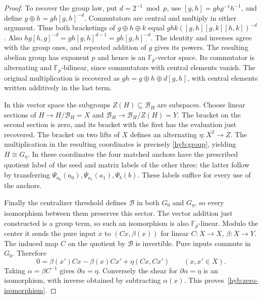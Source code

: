 \documentclass[11pt]{article}
\newcommand{\F}{\mathbb F_p}
\theoremstyle{definition}
\theoremstyle{remark}
\numberwithin{equation}{section}
\begin{document}
\begin{proof}
To recover the group law, put \(d=2^{-1}\bmod p\),
use \([g,h]=ghg^{-1}h^{-1}\), and define
\(g\oplus h=gh[g,h]^{-d}\). Commutators are central and multiply
in either argument. Thus both bracketings of \(g\oplus h\oplus k\)
equal \(ghk([g,h][g,k][h,k])^{-d}\). Also
\(hg[h,g]^{-d}=gh[g,h]^{d-1}=gh[g,h]^{-d}\).
The identity and inverses agree with the group ones, and repeated
addition of \(g\) gives its powers. The resulting abelian group has
exponent \(p\) and hence is an \(\F\)-vector space. Its commutator
is alternating and \(\F\)-bilinear, since commutators with central
elements vanish. The original multiplication is recovered as
\(gh=g\oplus h\oplus d[g,h]\), with central elements written additively
in the last term.

In this vector space the subgroups \(Z(H)\subseteq\mathcal B_H\)
are subspaces. Choose linear sections of \(H\to H/\mathcal B_H=X\)
and \(\mathcal B_H\to\mathcal B_H/Z(H)=Y\).
The bracket on the second section is zero, and its bracket with the
first has the evaluation just recovered. The bracket on two lifts of
\(X\) defines an alternating \(\eta:X^2\to Z\).
The multiplication in the resulting coordinates is precisely
\eqref{hyb:group}, yielding \(H\cong G_\eta\).
In these coordinates the four matched anchors have the prescribed
quotient label of the seed and matrix labels of the other three:
the latter follow by transferring
\(\Psi_{a_0}(a_0),\Psi_{a_1}(a_1),\Psi_b(b)\).
These labels suffice for every use of the anchors.

Finally the centralizer threshold defines \(\mathcal B\) in both
\(G_0\) and \(G_\eta\), so every isomorphism between them preserves
this sector. The vector addition just constructed is a group term,
so such an isomorphism is also \(\F\)-linear. Modulo the center it
sends the pure input \(x\) to \((Cx,\beta(x))\) for linear
\(C:X\to X\), \(\beta:X\to Y\). The induced map \(C\) on the
quotient by \(\mathcal B\) is invertible. Pure inputs commute in
\(G_0\). Therefore
\[
 0=\beta(x')Cx-\beta(x)Cx'+\eta(Cx,Cx')
 \qquad(x,x'\in X).
\]
Taking \(\alpha=\beta C^{-1}\) gives \(\partial\alpha=\eta\).
Conversely the shear for \(\partial\alpha=\eta\) is an isomorphism,
with inverse obtained by subtracting \(\alpha(x)\).
This proves~\eqref{hyb:zero-isomorphism}.
\end{proof}
\end{document}

